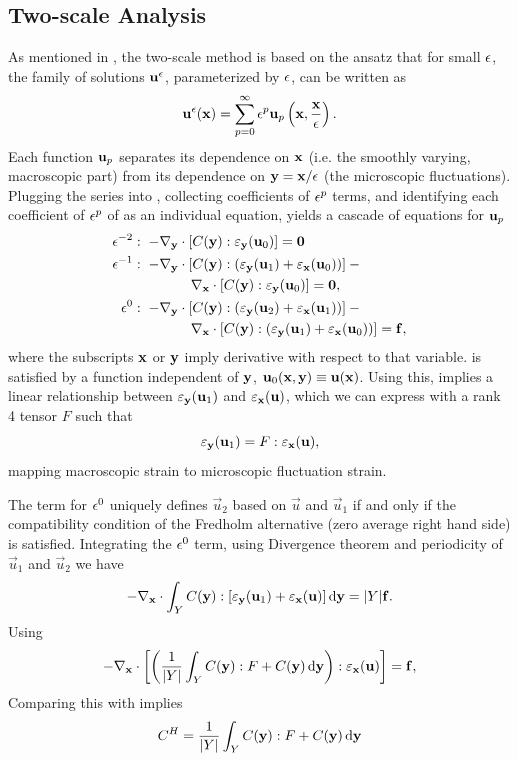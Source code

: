 \documentclass[twocolumn,10pt]{article}
\begin{document}
\subsection{Two-scale Analysis}
As mentioned in , the two-scale method is based on the
ansatz that for small $\epsilon$, the family of solutions $\mathbf u^\epsilon$,
parameterized by $\epsilon$, can be written as
\begin{equation}
  \mathbf u^\epsilon(\mathbf x) = \sum_{p = 0}^{\infty} \epsilon^p \mathbf u_p\left(\mathbf x, \frac{\mathbf x}{\epsilon}\right).
\end{equation}
Each function $\mathbf u_p$ separates its dependence on $\mathbf x$ (i.e. the
smoothly varying, macroscopic part) from its dependence on $\mathbf y =
\mathbf x/\epsilon$ (the microscopic fluctuations). Plugging the series into
, collecting coefficients of $\epsilon^p$ terms, and
identifying each coefficient of $\epsilon^p$ of as an individual equation,
yields a cascade of equations for $\mathbf u_p$
\begin{align}
  \e^{-2}&:\; -\nabla_\y \cdot [C(\y) : \strain_\y(\u_0)] = \vec{0} \label{eqn:em2} \\
  \e^{-1}&:\; -\nabla_\y \cdot [C(\y) : (\strain_\y(\u_1) + \strain_\x(\u_0))] - \phantom{x}\notag\\
  &\hspace{.12\linewidth} \nabla_\x \cdot [C(\y) : \strain_\y(\u_0)] =  \vec{0},  \label{eqn:em1} \\
  \e^{0}&:\; -\nabla_\y \cdot [C(\y) : (\strain_\y(\u_2) + \strain_\x(\u_1))] - \phantom{x}\notag\\
  &\hspace{.12\linewidth} \nabla_\x \cdot [C(\y) : (\strain_\y(\u_1)+\strain_\x(\u_0))] =  \vec{f},\label{eqn:em0}
\end{align}
where the subscripts $\mathbf x$ or $\mathbf y$ imply derivative with respect to
that variable.  is satisfied by a function independent of
$\mathbf y$, $\mathbf u_0(\mathbf x,\mathbf y)\equiv \mathbf u(\mathbf x)$. Using this,  implies a
linear relationship between $\varepsilon_{\mathbf y}(\mathbf u_1)$ and $\varepsilon_{\mathbf x}(\mathbf u)$,
which we can express with a rank 4 tensor $F$ such that
\begin{equation}
  \label{eqn:macro2micro}
  \varepsilon_{\mathbf y}(\mathbf u_1) = F:\varepsilon_{\mathbf x}(\mathbf u),
\end{equation}
mapping macroscopic strain to microscopic fluctuation strain.

The term for $\epsilon^0$ uniquely defines $\vec{u}_2$ based on $\vec{u}$
and $\vec{u}_1$ if and only if the compatibility condition of the
Fredholm alternative (zero average right hand side) is
satisfied. Integrating the $\epsilon^0$ term, using Divergence theorem and
periodicity of $\vec{u}_1$ and $\vec{u}_2$ we have
\[
  -\nabla_{\mathbf x} \cdot \int_Y C(\mathbf y) : [\varepsilon_{\mathbf y}(\mathbf u_1) + \varepsilon_{\mathbf x}(\mathbf u)] \, \mathrm{d} \mathbf y = |Y| {\bf f}.
\]
Using 
\begin{equation}
  -\nabla_{\mathbf x} \cdot \left[ \left(\frac{1}{|Y|} \int_Y C(\mathbf y) : F + C(\mathbf y) \, \mathrm{d} {\bf y} \right) : \varepsilon_{\mathbf x}(\mathbf u) \right] = \mathbf f,
\end{equation}
Comparing this with  implies
\begin{equation}
  C^H = \frac{1}{|Y|} \int_Y C(\mathbf y) : F + C(\mathbf y) \, \mathrm{d} {\mathbf y}
\end{equation}
\end{document}
